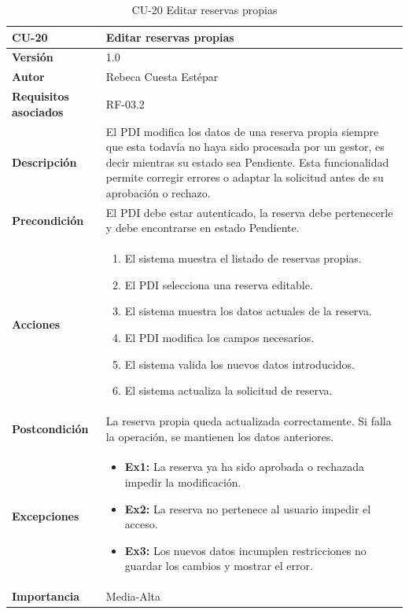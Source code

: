 \begin{table}[p]
	\centering
	\begin{tabularx}{\linewidth}{ p{} p{} }
		\toprule
		\textbf{CU-20} & \textbf{Editar reservas propias}\\
		\toprule
		\textbf{Versión} & 1.0 \\
		\textbf{Autor} & Rebeca Cuesta Estépar \\
		\textbf{Requisitos asociados} & RF-03.2 \\
		\textbf{Descripción} & El PDI modifica los datos de una reserva propia siempre que esta todavía no haya sido procesada por un gestor, es decir mientras su estado sea Pendiente. Esta funcionalidad permite corregir errores o adaptar la solicitud antes de su aprobación o rechazo. \\
		\textbf{Precondición} & El PDI debe estar autenticado, la reserva debe pertenecerle y debe encontrarse en estado Pendiente. \\
		\textbf{Acciones} &
		\begin{enumerate}
			\def\labelenumi{\arabic{enumi}.}
			\tightlist
			\item El sistema muestra el listado de reservas propias.
			\item El PDI selecciona una reserva editable.
			\item El sistema muestra los datos actuales de la reserva.
			\item El PDI modifica los campos necesarios.
			\item El sistema valida los nuevos datos introducidos.
			\item El sistema actualiza la solicitud de reserva.
		\end{enumerate}\\
		\textbf{Postcondición} & La reserva propia queda actualizada correctamente. Si falla la operación, se mantienen los datos anteriores. \\
		\textbf{Excepciones} &
		\begin{itemize}
			\tightlist
			\item \textbf{Ex1:} La reserva ya ha sido aprobada o rechazada \textrightarrow{} impedir la modificación.
			\item \textbf{Ex2:} La reserva no pertenece al usuario \textrightarrow{} impedir el acceso.
			\item \textbf{Ex3:} Los nuevos datos incumplen restricciones \textrightarrow{} no guardar los cambios y mostrar el error.
		\end{itemize}\\
		\textbf{Importancia} & Media-Alta \\
		\bottomrule
	\end{tabularx}
	\caption{CU-20 Editar reservas propias}
\end{table}